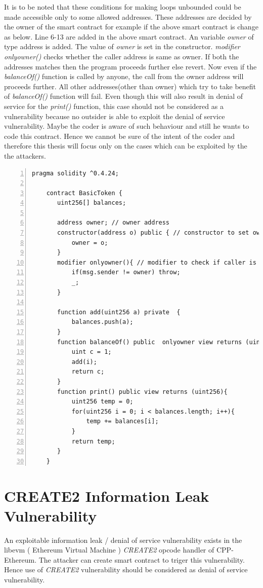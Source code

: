 \documentclass{article}
\begin{document}
It is to be noted that these conditions for making loops unbounded could be made accessible only to some allowed addresses. These addresses are decided by the owner of the smart contract for example if the above smart contract is change as below. Line 6-13 are added in the above smart contract. An variable \emph{owner} of type address is added. The value of \emph{owner} is set in the constructor. \emph{modifier onlyowner()} checks whether the caller address is same as owner. If both the addresses matches then the program proceeds further else revert. Now even if the \emph{balanceOf()} function is called by anyone, the call from the owner address will proceeds further. All other addresses(other than owner) which try to take benefit of \emph{balanceOf()} function will fail. Even though this will also result in denial of service for the \emph{print()} function, this case should not be considered as a vulnerability because no outsider is able to exploit the denial of service vulnerability. Maybe the coder is aware of such behaviour and still he wants to code this contract. Hence we cannot be sure of the intent of the coder and therefore this thesis will focus only on the cases which can be exploited by the the attackers. 

\newpage
\begin{Verbatim}[numbers=left,xleftmargin=5mm]
    pragma solidity ^0.4.24;

    contract BasicToken {
       uint256[] balances;
       
       address owner; // owner address
       constructor(address o) public { // constructor to set owner
           owner = o;
       }
       modifier onlyowner(){ // modifier to check if caller is owner else revert
           if(msg.sender != owner) throw;
           _;
       }
    
       function add(uint256 a) private  {
           balances.push(a);
       }
       function balanceOf() public  onlyowner view returns (uint256) {
           uint c = 1;
           add(i);
           return c;
       }
       function print() public view returns (uint256){
           uint256 temp = 0;
           for(uint256 i = 0; i < balances.length; i++){
               temp += balances[i];
           }
           return temp;
       }
    }
\end{Verbatim}
\newpage
\section*{CREATE2 Information Leak Vulnerability}
An exploitable information leak / denial of service vulnerability exists in the libevm ( Ethereum Virtual Machine ) \emph{CREATE2} opcode handler of CPP-Ethereum. The attacker can create smart contract to triger this vulnerability. Hence use of \emph{CREATE2} vulnerability should be considered as denial of service vulnerability.
\end{document}
